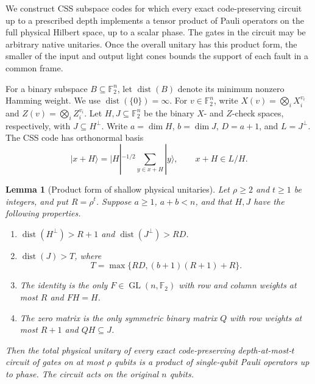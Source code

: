 \documentclass[aps,prl,reprint,notitlepage,nofootinbib,nobibnotes]{revtex4-2}
\newtheorem{lemma}{Lemma}
\begin{document}
We construct CSS subspace codes for which every exact code-preserving circuit up to a prescribed depth implements a tensor product of Pauli operators on the full physical Hilbert space, up to a scalar phase. The gates in the circuit may be arbitrary native unitaries. Once the overall unitary has this product form, the smaller of the input and output light cones bounds the support of each fault in a common frame.

For a binary subspace \(B\subseteq\mathbb F_2^n\), let \(\operatorname{dist}(B)\) denote its minimum nonzero Hamming weight. We use \(\operatorname{dist}(\{0\})=\infty\). For \(v\in\mathbb F_2^n\), write \(X(v)=\bigotimes_i X_i^{v_i}\) and \(Z(v)=\bigotimes_i Z_i^{v_i}\). Let \(H,J\subseteq\mathbb F_2^n\) be the binary \(X\)- and \(Z\)-check spaces, respectively, with \(J\subseteq H^\perp\). Write \(a=\dim H\), \(b=\dim J\), \(D=a+1\), and \(L=J^\perp\). The CSS code has orthonormal basis
\begin{equation}\label{em:upper-css-basis}
 |x+H\rangle=|H|^{-1/2}\sum_{y\in x+H}|y\rangle ,
 \qquad x+H\in L/H .
\end{equation}

\begin{lemma}[Product form of shallow physical unitaries]
\label{em:upper-rigidity}
Let \(\rho\ge2\) and \(t\ge1\) be integers, and put \(R=\rho^t\). Suppose \(a\ge1\), \(a+b<n\), and that \(H,J\) have the following properties.
\begin{enumerate}
\item \(\operatorname{dist}(H^\perp)>R+1\) and
  \(\operatorname{dist}(J^\perp)>RD\).
\item \(\operatorname{dist}(J)>T\), where
\begin{equation}\label{em:upper-deletion}
 T=\max\{RD,(b+1)(R+1)+R\}.
\end{equation}
\item The identity is the only \(F\in\operatorname{GL}(n,\mathbb F_2)\) with row and column weights at most \(R\) and \(FH=H\).
\item The zero matrix is the only symmetric binary matrix \(Q\) with row weights at most \(R+1\) and \(QH\subseteq J\).
\end{enumerate}
Then the total physical unitary of every exact code-preserving depth-at-most-\(t\) circuit of gates on at most \(\rho\) qubits is a product of single-qubit Pauli operators up to phase. The circuit acts on the original \(n\) qubits.
\end{lemma}
\end{document}
